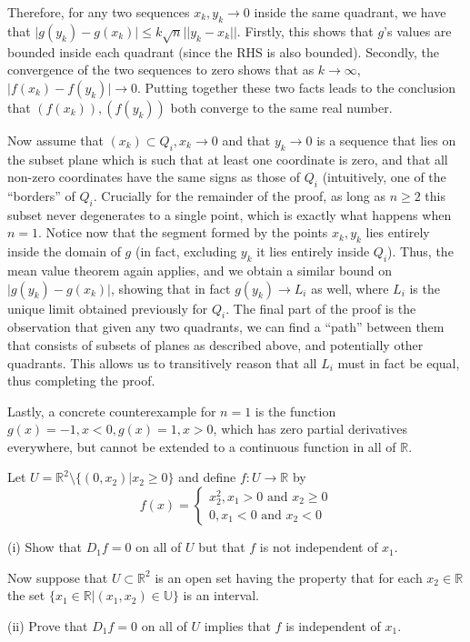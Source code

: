 \begin{solution}
    Therefore, for any two sequences $x_k, y_k \rightarrow 0$ inside the same quadrant, we have that $\lvert g(y_k) - g(x_k) \rvert \leq k \sqrt{n} \lvert \lvert y_k - x_k \rvert \rvert$.
    Firstly, this shows that $g$'s values are bounded inside each quadrant (since the RHS is also bounded).
    Secondly, the convergence of the two sequences to zero shows that as $k \rightarrow \infty$, $\lvert f(x_k) - f(y_k) \rvert \rightarrow 0$.
    Putting together these two facts leads to the conclusion that $(f(x_k)), (f(y_k))$ both converge to the same real number.

    Now assume that $(x_k) \subset Q_i, x_k \rightarrow 0$ and that $y_k \rightarrow 0$ is a sequence that lies on the subset plane which is such that at least one coordinate is zero, and that all non-zero coordinates have the same signs as those of $Q_i$ (intuitively, one of the ``borders'' of $Q_i$.
    Crucially for the remainder of the proof, as long as $n \geq 2$ this subset never degenerates to a single point, which is exactly what happens when $n = 1$.
    Notice now that the segment formed by the points $x_k, y_k$ lies entirely inside the domain of $g$ (in fact, excluding $y_k$ it lies entirely inside $Q_i$).
    Thus, the mean value theorem again applies, and we obtain a similar bound on $\lvert g(y_k) - g(x_k) \rvert$, showing that in fact $g(y_k) \rightarrow L_i$ as well, where $L_i$ is the unique limit obtained previously for $Q_i$.
    The final part of the proof is the observation that given any two quadrants, we can find a ``path'' between them that consists of subsets of planes as described above, and potentially other quadrants.
    This allows us to transitively reason that all $L_i$ must in fact be equal, thus completing the proof.

    Lastly, a concrete counterexample for $n = 1$ is the function $g(x) = -1, x < 0, g(x) = 1, x > 0$, which has zero partial derivatives everywhere, but cannot be extended to a continuous function in all of $\mathbb{R}$.
\end{solution}

\begin{exercise}{18}
    Let $U = \mathbb{R}^2 \setminus \{(0, x_2) \lvert x_2 \geq 0\}$ and define $f: U \rightarrow \mathbb{R}$ by
    $$f(x) = \begin{cases}
        x_2^2, x_1 > 0 \text{ and } x_2 \geq 0 \\
        0, x_1 < 0 \text{ and } x_2 < 0
    \end{cases}$$

    (i) Show that $D_1 f = 0$ on all of $U$ but that $f$ is not independent of $x_1$.

    Now suppose that $U \subset \mathbb{R}^2$ is an open set having the property that for each $x_2 \in \mathbb{R}$ the set $\{ x_1 \in \mathbb{R} \lvert (x_1, x_2) \in \mathbb{U}\}$ is an interval.

    (ii) Prove that $D_1 f = 0$ on all of $U$ implies that $f$ is independent of $x_1$.
\end{exercise}

